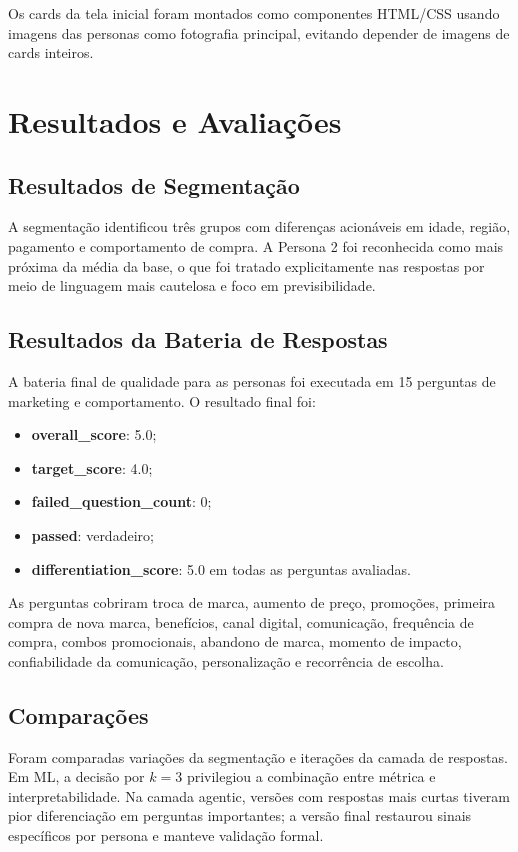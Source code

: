 \documentclass[12pt,a4paper]{article}
\begin{document}
Os cards da tela inicial foram montados como componentes HTML/CSS usando imagens das personas como fotografia principal, evitando depender de imagens de cards inteiros.

\section{Resultados e Avaliações}

\subsection{Resultados de Segmentação}

A segmentação identificou três grupos com diferenças acionáveis em idade, região, pagamento e comportamento de compra. A Persona 2 foi reconhecida como mais próxima da média da base, o que foi tratado explicitamente nas respostas por meio de linguagem mais cautelosa e foco em previsibilidade.

\subsection{Resultados da Bateria de Respostas}

A bateria final de qualidade para as personas foi executada em 15 perguntas de marketing e comportamento. O resultado final foi:

\begin{itemize}
  \item \textbf{overall\_score}: 5.0;
  \item \textbf{target\_score}: 4.0;
  \item \textbf{failed\_question\_count}: 0;
  \item \textbf{passed}: verdadeiro;
  \item \textbf{differentiation\_score}: 5.0 em todas as perguntas avaliadas.
\end{itemize}

As perguntas cobriram troca de marca, aumento de preço, promoções, primeira compra de nova marca, benefícios, canal digital, comunicação, frequência de compra, combos promocionais, abandono de marca, momento de impacto, confiabilidade da comunicação, personalização e recorrência de escolha.

\subsection{Comparações}

Foram comparadas variações da segmentação e iterações da camada de respostas. Em ML, a decisão por $k=3$ privilegiou a combinação entre métrica e interpretabilidade. Na camada agentic, versões com respostas mais curtas tiveram pior diferenciação em perguntas importantes; a versão final restaurou sinais específicos por persona e manteve validação formal.
\end{document}
